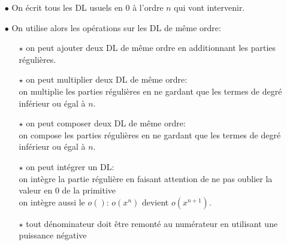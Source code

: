 \documentclass[a4paper, 11pt]{article}
\begin{document}
{\begin{dboxminipage}{0.9 \textwidth}
 
\begin{itemize} 
\item[$\bullet$] On \'ecrit tous les DL usuels en 0 \`a l'ordre $n$ qui vont intervenir.
\item[$\bullet$] On utilise alors les op\'erations sur les DL de m\^eme ordre:
\begin{itemize} 
\item[$\star$] on peut ajouter deux DL de m\^eme ordre en additionnant les parties r\'eguli\`eres. 
\item[$\star$] on peut multiplier deux DL de m\^eme ordre:\\
on multiplie les parties r\'eguli\`eres en ne gardant que les termes de degr\'e inf\'erieur ou \'egal \`a $n$.
\item[$\star$] on peut composer deux DL de m\^eme ordre:\\
on compose les parties r\'eguli\`eres en ne gardant que les termes de degr\'e inf\'erieur ou \'egal \`a $n$.
\item[$\star$] on peut int\'egrer un DL: \\
\noindent on int\`egre la partie r\'eguli\`ere en faisant attention de ne pas oublier la valeur en 0 de la primitive\\
\noindent on int\`egre aussi le $o()$: $o(x^n)$ devient $o(x^{n+1})$.
 \item[$\star$] tout d\'enominateur doit \^etre remont\'e au num\'erateur en utilisant une puissance n\'egative
\end{itemize}
\end{itemize}
\end{dboxminipage}

}
\end{document}
